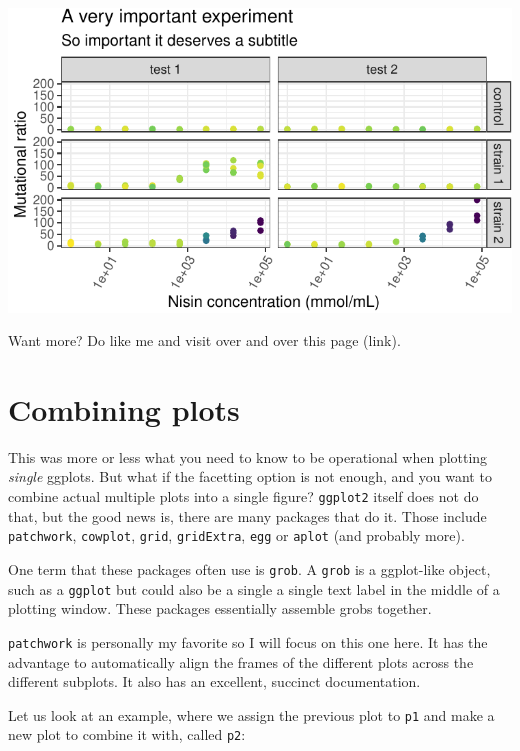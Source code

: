 \documentclass[]{book}
\begin{document}
\begin{center}\includegraphics[width=\textwidth]{TRES-Tidy-Tutorial_files/figure-latex/unnamed-chunk-146-1} \end{center}

Want more? Do like me and visit over and over this page (link).

\hypertarget{combining-plots}{%
\section{Combining plots}\label{combining-plots}}

This was more or less what you need to know to be operational when plotting \emph{single} ggplots. But what if the facetting option is not enough, and you want to combine actual multiple plots into a single figure? \texttt{ggplot2} itself does not do that, but the good news is, there are many packages that do it. Those include \texttt{patchwork}, \texttt{cowplot}, \texttt{grid}, \texttt{gridExtra}, \texttt{egg} or \texttt{aplot} (and probably more).

One term that these packages often use is \texttt{grob}. A \texttt{grob} is a ggplot-like object, such as a \texttt{ggplot} but could also be a single a single text label in the middle of a plotting window. These packages essentially assemble grobs together.

\texttt{patchwork} is personally my favorite so I will focus on this one here. It has the advantage to automatically align the frames of the different plots across the different subplots. It also has an excellent, succinct documentation.

Let us look at an example, where we assign the previous plot to \texttt{p1} and make a new plot to combine it with, called \texttt{p2}:
\end{document}
